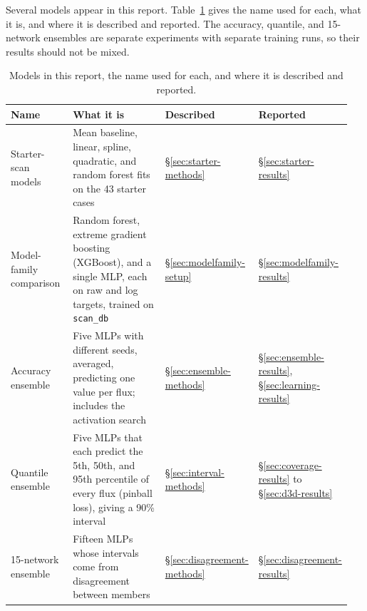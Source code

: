 \documentclass[12pt,letterpaper]{article}
\begin{document}
Several models appear in this report. Table~\ref{tab:models} gives the name
used for each, what it is, and where it is described and reported. The
accuracy, quantile, and 15-network ensembles are separate experiments with
separate training runs, so their results should not be mixed.

\begin{table}[htbp]
  \centering
  \small
  \setlength{\tabcolsep}{4pt}
  \begin{tabular}{@{}p{0.2\linewidth}p{0.44\linewidth}p{0.14\linewidth}p{0.17\linewidth}@{}}
    \toprule
    Name                    & What it is                                                                                                          & Described                        & Reported                                                   \\
    \midrule
    Starter-scan models     & Mean baseline, linear, spline, quadratic, and random forest fits on the 43 starter cases                            & \S\ref{sec:starter-methods}      & \S\ref{sec:starter-results}                                \\
    Model-family comparison & Random forest, extreme gradient boosting (XGBoost), and a single MLP, each on raw and log targets, trained on \texttt{scan\_db}                 & \S\ref{sec:modelfamily-setup}    & \S\ref{sec:modelfamily-results}                            \\
    Accuracy ensemble       & Five MLPs with different seeds, averaged, predicting one value per flux; includes the activation search             & \S\ref{sec:ensemble-methods}     & \S\ref{sec:ensemble-results}, \S\ref{sec:learning-results} \\
    Quantile ensemble       & Five MLPs that each predict the 5th, 50th, and 95th percentile of every flux (pinball loss), giving a 90\% interval & \S\ref{sec:interval-methods}     & \S\ref{sec:coverage-results} to \S\ref{sec:d3d-results}    \\
    15-network ensemble     & Fifteen MLPs whose intervals come from disagreement between members                                                 & \S\ref{sec:disagreement-methods} & \S\ref{sec:disagreement-results}                           \\
    \bottomrule
  \end{tabular}
  \caption{Models in this report, the name used for each, and where it is
    described and reported.}
  \label{tab:models}
\end{table}
\end{document}

